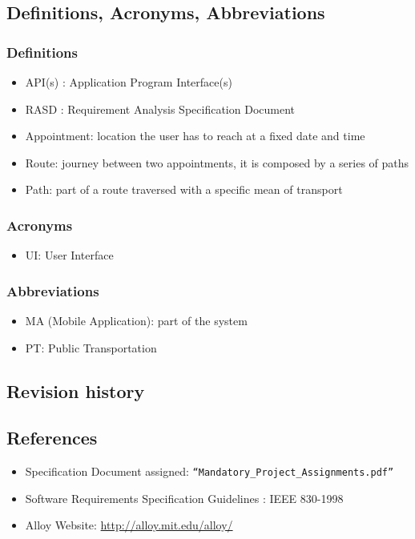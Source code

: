 \subsection{Definitions, Acronyms, Abbreviations}

\subsubsection{Definitions}
\begin{itemize}
	\item API(s) : Application Program Interface(s)
	\item RASD : Requirement Analysis Specification Document
	\item Appointment: location the user has to reach at a fixed date and time
	\item Route: journey between two appointments, it is composed by a series of paths
	\item Path: part of a route traversed with a specific mean of transport
\end{itemize}


\subsubsection{Acronyms}
\begin{itemize}
	\item UI: User Interface
\end{itemize}

\subsubsection{Abbreviations}
\begin{itemize}
	\item MA (Mobile Application): part of the system
	\item PT: Public Transportation
\end{itemize}

\subsection{Revision history}




\subsection{References}


\begin{itemize}
	\item Specification Document assigned: \texttt{“Mandatory\_Project\_Assignments.pdf”}
	\item Software Requirements Specification Guidelines : IEEE 830-1998
	\item Alloy Website: \url{http://alloy.mit.edu/alloy/}
\end{itemize}


